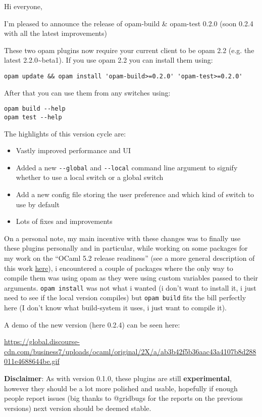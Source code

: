 \documentclass[11pt]{article}
\begin{document}
Hi everyone,

I'm pleased to announce the release of opam-build \& opam-test 0.2.0 (soon 0.2.4 with all the latest improvements)

These two opam plugins now require your current client to be opam 2.2 (e.g. the latest 2.2.0\textasciitilde{}beta1).
If you use opam 2.2 you can install them using:
\begin{verbatim}
opam update && opam install 'opam-build>=0.2.0' 'opam-test>=0.2.0'
\end{verbatim}
After that you can use them from any switches using:
\begin{verbatim}
opam build --help
opam test --help
\end{verbatim}

The highlights of this version cycle are:
\begin{itemize}
\item Vastly improved performance and UI
\item Added a new \texttt{-{}-{}global} and \texttt{-{}-{}local} command line argument to signify whether to use a local switch or a global switch
\item Add a new config file storing the user preference and which kind of switch to use by default
\item Lots of fixes and improvements
\end{itemize}

On a personal note, my main incentive with these changes was to finally use these plugins personally and in
particular, while working on some packages for my work on the ``OCaml 5.2 release readiness'' (see a more general
description of this work
\href{https://discuss.ocaml.org/t/ocaml-software-foundation-january-2024-update/13828\#infrastructure-5}{here}), i
encountered a couple of packages where the only way to compile them was using opam as they were using custom
variables passed to their arguments. \texttt{opam install} was not what i wanted (i don't want to install it, i just need
to see if the local version compiles) but \texttt{opam build} fits the bill perfectly here (I don't know what build-system
it uses, i just want to compile it).

A demo of the new version (here 0.2.4) can be seen here:

\url{https://global.discourse-cdn.com/business7/uploads/ocaml/original/2X/a/ab3b42f5b36aac43a4107b8d288011e4688644be.gif}

\textbf{Disclaimer}: As with version 0.1.0, these plugins are still \textbf{experimental}, however they should be a lot more
polished and usable, hopefully if enough people report issues (big thanks to @gridbugs for the reports on the
previous versions) next version should be deemed stable.
\end{document}
